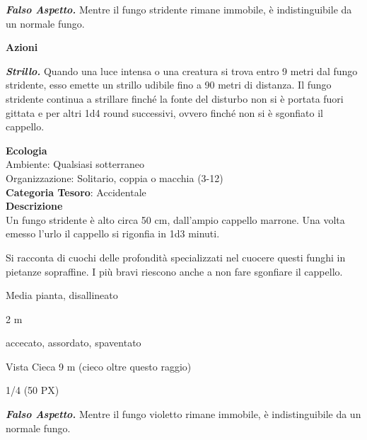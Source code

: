 \begin{multicols}{2}
{\emph{\textbf{Falso Aspetto.}} Mentre il fungo stridente rimane immobile, è indistinguibile da un normale fungo.

\textbf{Azioni}

\emph{\textbf{Strillo.}} Quando una luce intensa o una creatura si trova entro 9 metri dal fungo stridente, esso emette un strillo udibile fino a 90 metri di distanza. Il fungo stridente continua a strillare finché la fonte del disturbo non si è portata fuori gittata e per altri 1d4 round successivi, ovvero finché non si è sgonfiato il cappello.

\textbf{Ecologia}\\
Ambiente: Qualsiasi sotterraneo\\
Organizzazione: Solitario, coppia o macchia (3-12)\\
\textbf{Categoria Tesoro}: Accidentale\\
\textbf{Descrizione}\\
Un fungo stridente è alto circa 50 cm, dall'ampio cappello marrone. Una volta emesso l'urlo il cappello si rigonfia in 1d3 minuti.

Si racconta di cuochi delle profondità specializzati nel cuocere questi funghi in pietanze sopraffine. I più bravi riescono anche a non fare sgonfiare il cappello.

\begin{description}[noitemsep, topsep=0pt, parsep=0pt, partopsep=0pt, itemsep=1pt, leftmargin=2.35cm,  labelwidth=2.2cm, itemindent=0cm, listparindent=0pt] %
\setlength{\baselineskip}{10pt}
\item[\textbf{Taglia/Tipo}] Media pianta, disallineato
\item[\textbf{Caratt.}] 
\item[\textbf{Punti Ferita}] 
\item[\textbf{Movimento}] 2 m
\item[\textbf{Tiri Salvez.}] 
\item[\textbf{Immunità}] accecato, assordato, spaventato
\item[\textbf{Sensi}] Vista Cieca 9 m (cieco oltre questo raggio)
\item[\textbf{Sfida}] 1/4 (50 PX)
\end{description}
\smallskip

\emph{\textbf{Falso Aspetto.}} Mentre il fungo violetto rimane immobile, è indistinguibile da un normale fungo.

}
\end{multicols}
